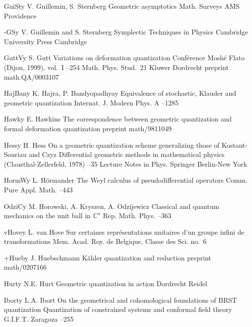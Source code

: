 \documentclass[12pt]{amsart}
\numberwithin{equation}{section}
\theoremstyle{remark}
\newcommand{\CC}{\C}
\newcommand{\by}{\mathbf y}
\newcommand{\C}{\mathbb C}
\begin{document}
\begin{thebibliography}{199}
 GuiSt\by{ V. Guillemin, S. Sternberg \book Geometric asymptotics
\bookinfo Math. Surveys  \publ AMS \publaddr Providence }

 -GS\by{ V. Guillemin and S. Sternberg \book Symplectic Techniques in
Physics \publ Cambridge University Press \publaddr Cambridge }

 GuttV\by{ S. Gutt \paper Variations on deformation quantization
\inbook Conf\'erence Mosh\'e Flato (Dijon, 1999), vol.~I --254
\bookinfo Math. Phys. Stud.~21 \publ Kluwer \publaddr Dordrecht 
\paperinfo preprint math.QA/0003107}

 HajBan\by{ K. Hajra, P. Bandyopadhyay \paper Equivalence of stochastic,
Klauder and geometric quantization \jour Internat. J. Modern Phys. A 
 --1285}

 Hawk\by{ E. Hawkins \paper The correspondence between geometric
quantization and formal deformation quantization \jour preprint math/9811049
}

 Hess\by{ H. Hess \paper On a geometric quantization scheme generalizing
those of Kostant-Souriau and Czyz \inbook Differential geometric methods
in mathematical physics (Clausthal-Zellerfeld, 1978) --35 \bookinfo
Lecture Notes in Phys.  \publ Springer \publaddr Berlin-New York
}

 HormW\by{ L. H\"ormander \paper The Weyl calculus of pseudodifferential
operators \jour Comm. Pure Appl. Math.   --443}

 OdziC\by{ M. Horowski, A. Kryszen, A. Odzijewicz \paper Classical and
quantum mechanics on the unit ball in $\CC^n$ \jour Rep. Math. Phys. 
 --363}

 vHove\by{ L. van Hove \paper Sur certaines repr\'esentations unitaires
d'un groupe infini de transformations \jour Mem. Acad. Roy. de Belgique, Classe
des Sci.   \pages no.~6}

 +Hueb\by{ J. Huebschmann \paper K\"ahler quantization and reduction
\paperinfo preprint math/0207166}

 Hurt\by{ N.E. Hurt \book Geometric quantization in action \publaddr
Dordrecht \publ Reidel }

 Ibort\by{ L.A. Ibort \paper On the geometrical and cohomological
foundations of BRST quantization \inbook Quantization of constrained systems
and conformal field theory  \publ G.I.F.T. \publaddr
Zaragoza  --255}


\end{thebibliography}
\end{document}
